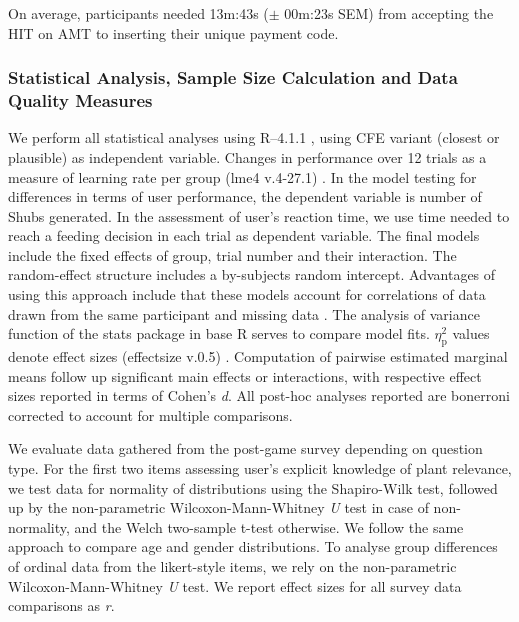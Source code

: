 {On average, participants needed 13m:43s ($\pm$ 00m:23s SEM) from accepting the HIT on AMT to inserting their unique payment code.

\subsubsection{Statistical Analysis, Sample Size Calculation and Data Quality Measures}

We perform all statistical analyses using R–4.1.1 \citep{r_core_team_r_2021}, using \gls{CFE} variant (closest or plausible) as independent variable.
Changes in performance over 12 trials as a measure of learning rate per group (lme4 v.4-27.1) \citep{bates_fitting_2015}.
In the model testing for differences in terms of user performance, the dependent variable is number of Shubs generated. 
In the assessment of user's reaction time, we use time needed to reach a feeding decision in each trial as dependent variable.
The final models include the fixed effects of group, trial number and their interaction. The random-effect structure includes a by-subjects random intercept. 
Advantages of using this approach include that these models account for correlations of data drawn from the same participant and missing data \citep{detry_analyzing_2016,muth_alternative_2016}.
The analysis of variance function of the stats package in base R serves to compare model fits.
$\eta_{\text{p}}^{2}$ values denote effect sizes (effectsize v.0.5) \citep{ben-shachar_effectsize_2020}.
Computation of pairwise estimated marginal means follow up significant main effects or interactions, with respective effect sizes reported in terms of Cohen’s \textit{d}.
All post-hoc analyses reported are bonerroni corrected to account for multiple comparisons.

We evaluate data gathered from the post-game survey depending on question type.
For the first two items assessing user's explicit knowledge of plant relevance, we test data for normality of distributions using the Shapiro-Wilk test, followed up by the non-parametric Wilcoxon-Mann-Whitney \textit{U} test in case of non-normality, and the Welch two-sample t-test otherwise. 
We follow the same approach to compare age and gender distributions.
To analyse group differences of ordinal data from the likert-style items, we rely on the non-parametric Wilcoxon-Mann-Whitney \textit{U} test.
We report effect sizes for all survey data comparisons as \textit{r}.

}
